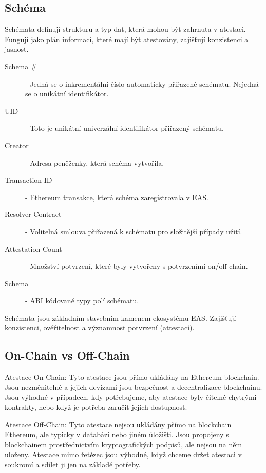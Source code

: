 \subsection{Schéma}\label{subsec:Schema}

Schémata definují strukturu a typ dat, která mohou být zahrnuta v atestaci. Fungují jako plán informací, které mají být atestovány, zajišťují konzistenci a jasnost.



\begin{description}
	\item[Schema \#] -  Jedná se o inkrementální číslo automaticky přiřazené schématu. Nejedná se o unikátní identifikátor.
	\item[UID] - Toto je unikátní univerzální identifikátor přiřazený schématu.
	\item[Creator] - Adresa peněženky, která schéma vytvořila.
	\item[Transaction ID] - Ethereum transakce, která schéma zaregistrovala v EAS.
	\item[Resolver Contract] - Volitelná smlouva přiřazená k schématu pro složitější případy užití.
	\item[Attestation Count] - Množství potvrzení, které byly vytvořeny s potvrzeními on/off chain.
	\item[Schema] - ABI kódované typy polí schématu.
\end{description}


Schémata jsou základním stavebním kamenem ekosystému EAS. Zajišťují konzistenci, ověřitelnost a významnost potvrzení (attestací).	\cite{EAS:Schema}




\subsection{On-Chain vs Off-Chain}\label{subsec:OnChain-OffChain}


Atestace On-Chain: Tyto atestace jsou přímo ukládány na Ethereum blockchain. Jsou nezměnitelné a jejich devízami jsou bezpečnost a decentralizace blockchainu. Jsou výhodné v případech, kdy potřebujeme, aby atestace byly čitelné chytrými kontrakty, nebo když je potřeba zaručit jejich dostupnost.

Atestace Off-Chain: Tyto atestace nejsou ukládány přímo na blockchain Ethereum, ale typicky v databázi nebo jiném úložišti. Jsou propojeny s blockchainem prostřednictvím kryptografických podpisů, ale nejsou na něm uloženy. Atestace mimo řetězec jsou výhodné, když chceme držet atestaci v soukromí a sdílet ji jen na základě potřeby. \cite{EAS:OnChainVsOffChain}


